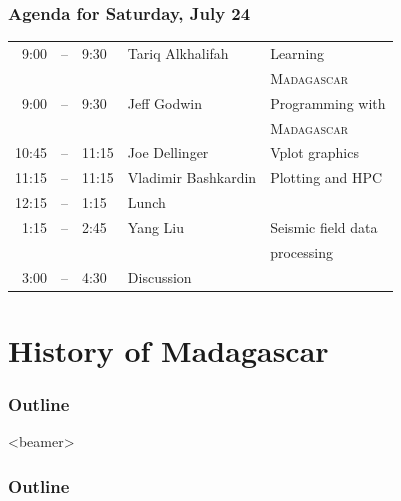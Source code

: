 \begin{frame}
\MadLogo
\frametitle{Agenda for Saturday, July 24}
\noindent\begin{tabular}{|rcl|l|l|} 
\hline 
9:00 & -- & 9:30 & Tariq Alkhalifah & Learning \\
        &      &         &                           & \textsc{Madagascar} \\
\hline 
9:00 & -- & 9:30 & Jeff Godwin & Programming with \\
        &      &         &                    & \textsc{Madagascar} \\
\hline
10:45 & -- & 11:15 & Joe Dellinger & Vplot graphics \\
\hline
11:15 & -- & 11:15 & Vladimir Bashkardin & Plotting and HPC \\
\hline 12:15 & -- & 1:15 & \multicolumn{2}{|l|}{Lunch} \\
\hline 1:15 & -- & 2:45 & Yang Liu & Seismic field data \\
                   &      &         &               & processing \\
\hline 3:00 & -- & 4:30 & \multicolumn{2}{|l|}{Discussion} \\
\hline 
\end{tabular}
\end{frame}

\section{History of Madagascar}

\begin{frame}
  \MadLogo
  \frametitle{Outline}
  \tableofcontents[pausesections]
\end{frame}

\begin{frame}<beamer>
  \MadLogo
  \frametitle{Outline}
  \tableofcontents[currentsection]
\end{frame}

